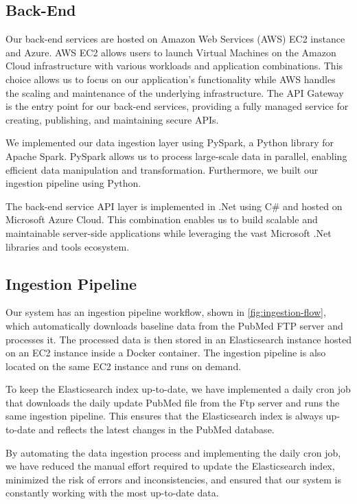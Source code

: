 \subsection{Back-End}

Our back-end services are hosted on Amazon Web Services (AWS) EC2 instance and Azure. AWS EC2 allows users to launch Virtual Machines on the Amazon Cloud infrastructure with various workloads and application combinations. This choice allows us to focus on our application's functionality while AWS handles the scaling and maintenance of the underlying infrastructure. The API Gateway is the entry point for our back-end services, providing a fully managed service for creating, publishing, and maintaining secure APIs. 

We implemented our data ingestion layer using PySpark, a Python library for Apache Spark. PySpark allows us to process large-scale data in parallel, enabling efficient data manipulation and transformation. Furthermore, we built our ingestion pipeline using Python. 

The back-end service API layer is implemented in .Net using C\# and hosted on Microsoft Azure Cloud. This combination enables us to build scalable and maintainable server-side applications while leveraging the vast Microsoft .Net libraries and tools ecosystem. 

\subsection{Ingestion Pipeline}

Our system has an ingestion pipeline workflow, shown in \autoref{fig:ingestion-flow}, which automatically downloads baseline data from the PubMed FTP server and processes it. The processed data is then stored in an Elasticsearch instance hosted on an EC2 instance inside a Docker container. The ingestion pipeline is also located on the same EC2 instance and runs on demand. 

To keep the Elasticsearch index up-to-date, we have implemented a daily cron job that downloads the daily update PubMed file from the Ftp server and runs the same ingestion pipeline. This ensures that the Elasticsearch index is always up-to-date and reflects the latest changes in the PubMed database. 

By automating the data ingestion process and implementing the daily cron job, we have reduced the manual effort required to update the Elasticsearch index, minimized the risk of errors and inconsistencies, and ensured that our system is constantly working with the most up-to-date data. 

